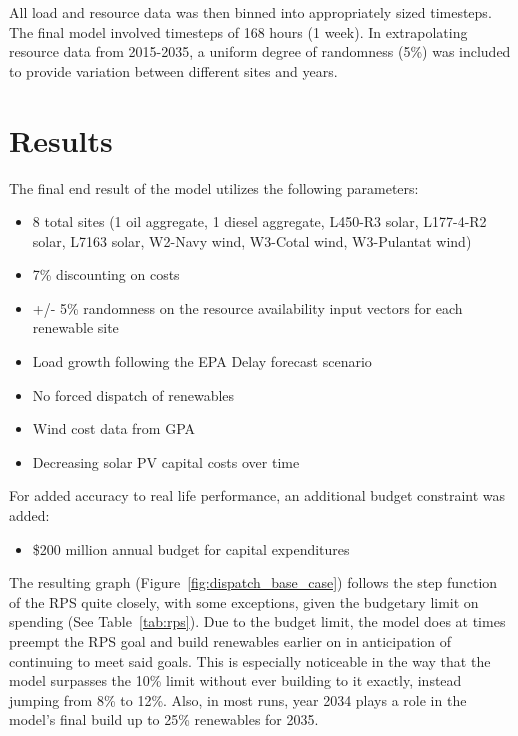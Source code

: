 \documentclass[12pt,letterpaper,fleqn]{article}
\begin{document}
All load and resource data was then binned into appropriately sized
timesteps. The final model involved timesteps of 168 hours (1
week). In extrapolating resource data from 2015-2035, a uniform
degree of randomness (5\%) was included to provide variation between
different sites and years. 

\section{Results}

The final end result of the model utilizes the following parameters:
\begin{itemize}
\item 8 total sites (1 oil aggregate, 1 diesel aggregate, L450-R3
  solar, L177-4-R2 solar, L7163 solar, W2-Navy wind, W3-Cotal wind,
  W3-Pulantat wind)
\item 7\% discounting on costs
\item +/- 5\% randomness on the resource availability input vectors
  for each renewable site
\item Load growth following the EPA Delay forecast scenario
\item No forced dispatch of renewables
\item Wind cost data from GPA
\item Decreasing solar PV capital costs over time
\end{itemize}

For added accuracy to real life performance, an additional budget
constraint was added:
\begin{itemize}
\item \$200 million annual budget for capital expenditures
\end{itemize}

The resulting graph (Figure~\ref{fig:dispatch_base_case}) follows the
step function of the RPS quite closely, with some exceptions, given
the budgetary limit on spending (See Table~\ref{tab:rps}). Due to the
budget limit, the model does at times preempt the RPS goal and build
renewables earlier on in anticipation of continuing to meet said
goals. This is especially noticeable in the way that the model
surpasses the 10\% limit without ever building to it exactly, instead
jumping from 8\% to 12\%. Also, in most runs, year 2034 plays a role
in the model's final build up to 25\% renewables for 2035.
\end{document}
